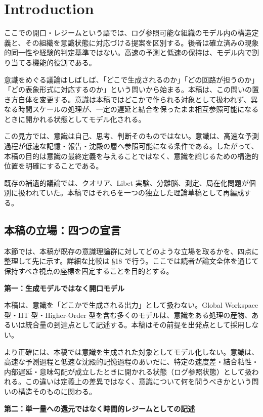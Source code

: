 \section{Introduction}

ここでの開口・レジームという語では、ログ参照可能な組織のモデル内の構造定義と、その組織を意識状態に対応づける提案を区別する。後者は確立済みの現象的同一性や経験的判定基準ではない。高速の予測と低速の保持は、モデル内で割り当てる機能的役割である。


意識をめぐる議論はしばしば、「どこで生成されるのか」「どの回路が担うのか」「どの表象形式に対応するのか」という問いから始まる。本稿は、この問いの置き方自体を変更する。意識は本稿ではどこかで作られる対象として扱われず、異なる時間スケールの処理が、一定の遅延と結合を保ったまま相互参照可能になるときに開かれる状態としてモデル化される。

この見方では、意識は自己、思考、判断そのものではない。意識は、高速な予測過程が低速な記憶・報告・沈殿の層へ参照可能になる条件である。したがって、本稿の目的は意識の最終定義を与えることではなく、意識を論じるための構造的位置を明確にすることである。

既存の補遺的議論では、クオリア、Libet 実験、分離脳、測定、局在化問題が個別に扱われていた。本稿ではそれらを一つの独立した理論草稿として再編成する。

\subsection{本稿の立場：四つの宣言}

本節では、本稿が既存の意識理論群に対してどのような立場を取るかを、四点に整理して先に示す。詳細な比較は §18 で行う。ここでは読者が論文全体を通じて保持すべき視点の座標を固定することを目的とする。

\textbf{第一：生成モデルではなく開口モデル}

本稿は、意識を「どこかで生成される出力」として扱わない。Global Workspace 型・IIT 型・Higher-Order 型を含む多くのモデルは、意識をある処理の産物、あるいは統合量の到達点として記述する。本稿はその前提を出発点として採用しない。

より正確には、本稿では意識を生成された対象としてモデル化しない。意識は、高速な予測過程と低速な沈殿的記憶過程のあいだに、特定の速度差・結合粘性・内部遅延・意味勾配が成立したときに開かれる状態（ログ参照状態）として扱われる。この違いは定義上の差異ではなく、意識について何を問うべきかという問いの構造そのものに関わる。

\textbf{第二：単一量への還元ではなく時間的レジームとしての記述}

